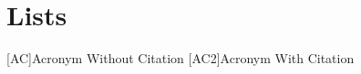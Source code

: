 \appendix
\renewcommand{\appendixtocname}{Appendix}
\renewcommand{\appendixpagename}{\appendixtocname}
\addappheadtotoc
{}
\appendixpage

\chapter{Lists}
\begin{acronym}[\hspace{3cm}]
  [AC]{Acronym Without Citation}
  [AC2]{Acronym With Citation \cite{citeKey2}}
\end{acronym}
\clearpage
\listoffigures
\lstlistoflistings
{}
